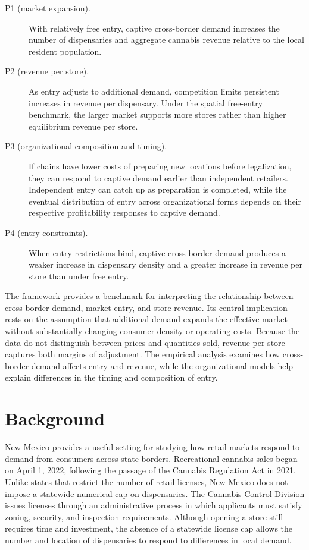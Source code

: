 \documentclass[english,12pt]{article}
\begin{document}
\begin{description}

\item[P1 (market expansion).]
With relatively free entry, captive cross-border demand increases the number of dispensaries and aggregate cannabis revenue relative to the local resident population.

\item[P2 (revenue per store).]
As entry adjusts to additional demand, competition limits persistent increases in revenue per dispensary. Under the spatial free-entry benchmark, the larger market supports more stores rather than higher equilibrium revenue per store.

\item[P3 (organizational composition and timing).]
If chains have lower costs of preparing new locations before legalization, they can respond to captive demand earlier than independent retailers. Independent entry can catch up as preparation is completed, while the eventual distribution of entry across organizational forms depends on their respective profitability responses to captive demand.

\item[P4 (entry constraints).]
When entry restrictions bind, captive cross-border demand produces a weaker increase in dispensary density and a greater increase in revenue per store than under free entry.

\end{description}

The framework provides a benchmark for interpreting the relationship between cross-border demand, market entry, and store revenue. Its central implication rests on the assumption that additional demand expands the effective market without substantially changing consumer density or operating costs. Because the data do not distinguish between prices and quantities sold, revenue per store captures both margins of adjustment. The empirical analysis examines how cross-border demand affects entry and revenue, while the organizational models help explain differences in the timing and composition of entry.




\section{Background}
\label{sec:background}

New Mexico provides a useful setting for studying how retail markets respond to demand from consumers across state borders. Recreational cannabis sales began on April 1, 2022, following the passage of the Cannabis Regulation Act in 2021. Unlike states that restrict the number of retail licenses, New Mexico does not impose a statewide numerical cap on dispensaries. The Cannabis Control Division issues licenses through an administrative process in which applicants must satisfy zoning, security, and inspection requirements. Although opening a store still requires time and investment, the absence of a statewide license cap allows the number and location of dispensaries to respond to differences in local demand.
\end{document}
